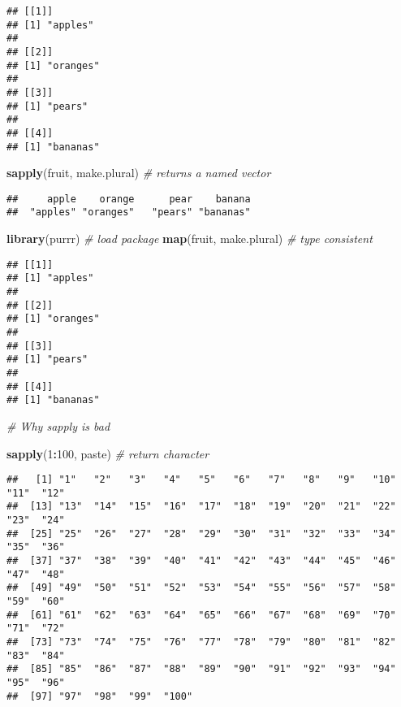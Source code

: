 \documentclass[
]{book}
\newenvironment{Shaded}{\begin{snugshade}}{\end{snugshade}}
\newcommand{\CommentTok}[1]{\textcolor[rgb]{0.56,0.35,0.01}{\textit{#1}}}
\newcommand{\DecValTok}[1]{\textcolor[rgb]{0.00,0.00,0.81}{#1}}
\newcommand{\KeywordTok}[1]{\textcolor[rgb]{0.13,0.29,0.53}{\textbf{#1}}}
\newcommand{\NormalTok}[1]{#1}
\newcommand{\OperatorTok}[1]{\textcolor[rgb]{0.81,0.36,0.00}{\textbf{#1}}}
\begin{document}
\begin{verbatim}
## [[1]]
## [1] "apples"
## 
## [[2]]
## [1] "oranges"
## 
## [[3]]
## [1] "pears"
## 
## [[4]]
## [1] "bananas"
\end{verbatim}

\begin{Shaded}
\begin{Highlighting}[]
\KeywordTok{sapply}\NormalTok{(fruit, make.plural) }\CommentTok{\# returns a named vector}
\end{Highlighting}
\end{Shaded}

\begin{verbatim}
##     apple    orange      pear    banana 
##  "apples" "oranges"   "pears" "bananas"
\end{verbatim}

\begin{Shaded}
\begin{Highlighting}[]
\KeywordTok{library}\NormalTok{(purrr) }\CommentTok{\# load package}
\KeywordTok{map}\NormalTok{(fruit, make.plural) }\CommentTok{\# type consistent}
\end{Highlighting}
\end{Shaded}

\begin{verbatim}
## [[1]]
## [1] "apples"
## 
## [[2]]
## [1] "oranges"
## 
## [[3]]
## [1] "pears"
## 
## [[4]]
## [1] "bananas"
\end{verbatim}

\begin{Shaded}
\begin{Highlighting}[]
\CommentTok{\# Why sapply is bad }

\KeywordTok{sapply}\NormalTok{(}\DecValTok{1}\OperatorTok{:}\DecValTok{100}\NormalTok{, paste) }\CommentTok{\# return character }
\end{Highlighting}
\end{Shaded}

\begin{verbatim}
##   [1] "1"   "2"   "3"   "4"   "5"   "6"   "7"   "8"   "9"   "10"  "11"  "12" 
##  [13] "13"  "14"  "15"  "16"  "17"  "18"  "19"  "20"  "21"  "22"  "23"  "24" 
##  [25] "25"  "26"  "27"  "28"  "29"  "30"  "31"  "32"  "33"  "34"  "35"  "36" 
##  [37] "37"  "38"  "39"  "40"  "41"  "42"  "43"  "44"  "45"  "46"  "47"  "48" 
##  [49] "49"  "50"  "51"  "52"  "53"  "54"  "55"  "56"  "57"  "58"  "59"  "60" 
##  [61] "61"  "62"  "63"  "64"  "65"  "66"  "67"  "68"  "69"  "70"  "71"  "72" 
##  [73] "73"  "74"  "75"  "76"  "77"  "78"  "79"  "80"  "81"  "82"  "83"  "84" 
##  [85] "85"  "86"  "87"  "88"  "89"  "90"  "91"  "92"  "93"  "94"  "95"  "96" 
##  [97] "97"  "98"  "99"  "100"
\end{verbatim}
\end{document}
